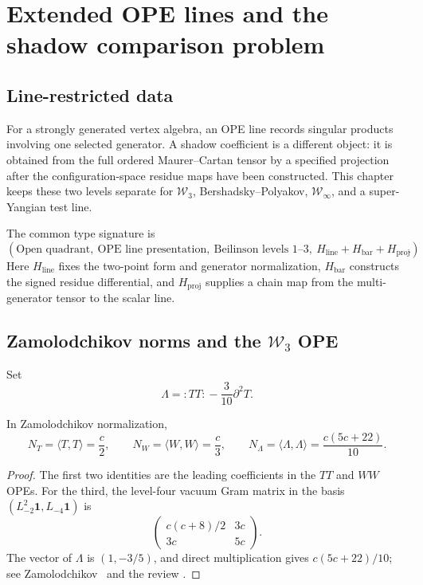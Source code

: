 
\chapter{Extended OPE lines and the shadow comparison problem}
\label{chap:shadow-tower-extended-families}

\section*{Line-restricted data}
\label{sec:shadow-tower-extended-overview}

For a strongly generated vertex algebra, an OPE line records singular
products involving one selected generator.  A shadow coefficient is a
different object: it is obtained from the full ordered Maurer--Cartan
tensor by a specified projection after the configuration-space residue
maps have been constructed.  This chapter keeps these two levels
separate for $\mathcal W_3$, Bershadsky--Polyakov,
$\mathcal W_\infty$, and a super-Yangian test line.

The common type signature is
\[
 (\text{Open quadrant},\ \text{OPE line presentation},\
 \text{Beilinson levels }1\text{--}3,\
 H_{\mathrm{line}}+H_{\mathrm{bar}}+H_{\mathrm{proj}}).
\]
Here $H_{\mathrm{line}}$ fixes the two-point form and generator
normalization, $H_{\mathrm{bar}}$ constructs the signed residue
differential, and $H_{\mathrm{proj}}$ supplies a chain map from the
multi-generator tensor to the scalar line.

\section{Zamolodchikov norms and the $\mathcal W_3$ OPE}
\label{sec:zamolodchikov-norms}

Set
\[
 \Lambda={:TT:}-\frac{3}{10}\partial^2T.
\]

\begin{proposition}[Canonical two-point norms;
\ClaimStatusProvedElsewhere]
\label{prop:canonical-two-point-norms}
In Zamolodchikov normalization,
\begin{equation}\label{eq:zamolodchikov-norms}
 N_T=\langle T,T\rangle=\frac c2,
 \qquad
 N_W=\langle W,W\rangle=\frac c3,
 \qquad
 N_\Lambda=\langle\Lambda,\Lambda\rangle
 =\frac{c(5c+22)}{10}.
\end{equation}
\end{proposition}

\begin{proof}
The first two identities are the leading coefficients in the $TT$ and
$WW$ OPEs.  For the third, the level-four vacuum Gram matrix in the
basis $(L_{-2}^2\mathbf1,L_{-4}\mathbf1)$ is
\[
 \begin{pmatrix}
  c(c+8)/2 & 3c\\
  3c & 5c
 \end{pmatrix}.
\]
The vector of $\Lambda$ is $(1,-3/5)$, and direct multiplication gives
$c(5c+22)/10$; see Zamolodchikov~\cite{Zam85} and the review
\cite{BowSch93}.
\end{proof}

